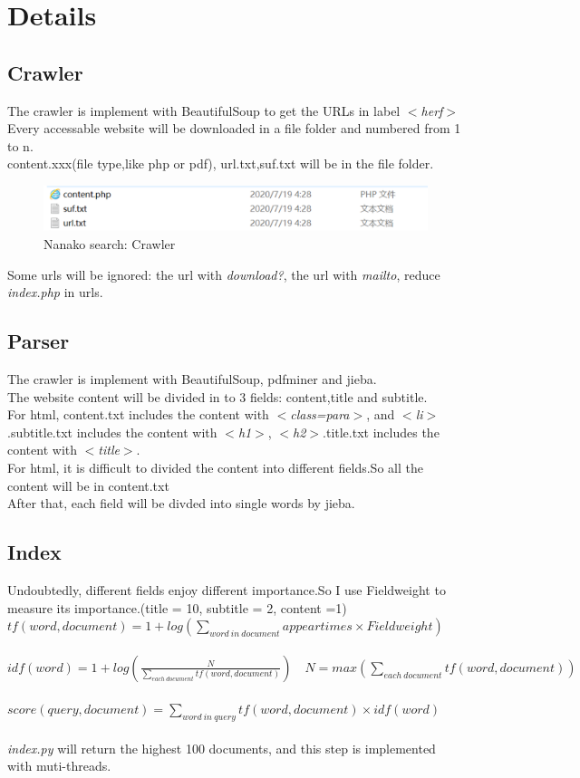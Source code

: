 \documentclass{article}
\begin{document}
\section{Details}
\subsection{Crawler}
The crawler is implement with BeautifulSoup to get the URLs in label \emph{$<$herf$>$}\\
\indent Every accessable website will be downloaded in a file folder and numbered from 1 to n.\\
\indent content.xxx(file type,like php or pdf), url.txt,suf.txt will be in the file folder.
\begin{figure}[h!]
\flushleft
\includegraphics[width=12.5cm]{eg1.png}
\caption{Nanako search: Crawler}
\end{figure}
\indent Some urls will be ignored: the url with \emph{download?}, the url with \emph{mailto}, reduce \emph{index.php} in urls.

\subsection{Parser}
The crawler is implement with BeautifulSoup, pdfminer and jieba.\\
\indent The website content will be divided in to 3 fields: content,title and subtitle.\\
\indent For html, content.txt includes the content with \emph{$<$class=para$>$}, and \emph{$<$li$>$}.\quad subtitle.txt includes the content with \emph{$<$h1$>$}, \emph{$<$h2$>$}.\quad title.txt includes the content with \emph{$<$title$>$}.\\
\indent For html, it is difficult to divided the content into different fields.So all the content will be in content.txt\\

\indent After that, each field will be divded into single words by jieba.\\
\subsection{Index}
Undoubtedly, different fields enjoy different importance.So I use Fieldweight to measure its importance.(title = 10, subtitle = 2, content =1)\\
\indent $tf(word,document) = 1+log(\sum_{word\ in \ document}appeartimes \times Fieldweight)$ \\\\
\indent $idf(word) = 1+log(\frac{N}{\sum_{each\ document}tf(word,document)})\quad N = max(\sum_{each\ document}tf(word,document))$\\\\
\indent $score(query,document)= \sum_{word\ in\ query} tf(word,document)\times idf(word)$\\\\
\indent \emph{index.py} will return the highest 100 documents, and this step is implemented with muti-threads.
\end{document}
